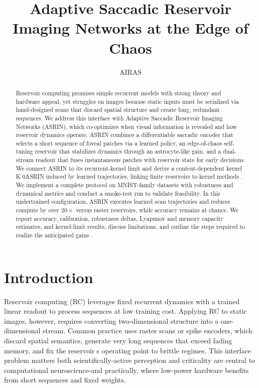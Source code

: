 \documentclass{article}
\title{Adaptive Saccadic Reservoir Imaging Networks at the Edge of Chaos}
\author{AIRAS}
\begin{document}
\maketitle

\begin{abstract}
Reservoir computing promises simple recurrent models with strong theory and hardware appeal, yet struggles on images because static inputs must be serialized via hand-designed scans that discard spatial structure and create long, redundant sequences. We address this interface with Adaptive Saccadic Reservoir Imaging Networks (ASRIN), which co-optimizes when visual information is revealed and how reservoir dynamics operate. ASRIN combines a differentiable saccadic encoder that selects a short sequence of foveal patches via a learned policy, an edge-of-chaos self-tuning reservoir that stabilizes dynamics through an astrocyte-like gain, and a dual-stream readout that fuses instantaneous patches with reservoir state for early decisions. We connect ASRIN to its recurrent-kernel limit and derive a content-dependent kernel K0ASRIN induced by learned trajectories, linking finite reservoirs to kernel methods \cite{dong-2020-reservoir,nestler-2020-unfolding}. We implement a complete protocol on MNIST-family datasets with robustness and dynamical metrics and conduct a smoke-test run to validate feasibility. In this undertrained configuration, ASRIN executes learned scan trajectories and reduces compute by over $20\times$ versus raster reservoirs, while accuracy remains at chance. We report accuracy, calibration, robustness deltas, Lyapunov and memory capacity estimates, and kernel-limit results, discuss limitations, and outline the steps required to realize the anticipated gains \cite{ivanov-2021-increasing}.
\end{abstract}

\section{Introduction}
Reservoir computing (RC) leverages fixed recurrent dynamics with a trained linear readout to process sequences at low training cost. Applying RC to static images, however, requires converting two-dimensional structure into a one-dimensional stream. Common practice uses raster scans or spike encoders, which discard spatial semantics, generate very long sequences that exceed fading memory, and fix the reservoirs operating point to brittle regimes. This interface problem matters both scientifically-active perception and criticality are central to computational neuroscience-and practically, where low-power hardware benefits from short sequences and fixed weights.
\end{document}
